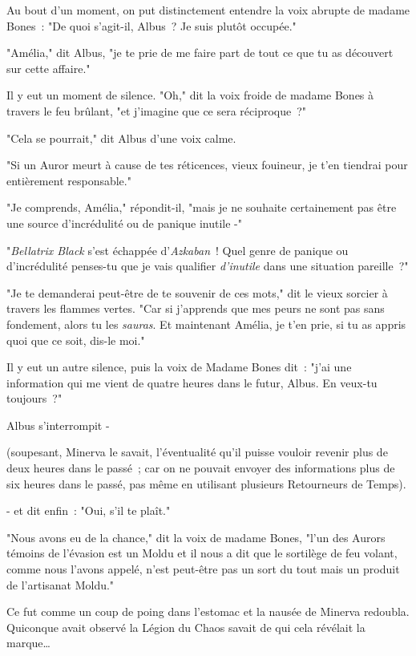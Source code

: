 Au bout d'un moment, on put distinctement entendre la voix abrupte de madame Bones~: "De quoi s'agit-il, Albus~? Je suis plutôt occupée."

"Amélia," dit Albus, "je te prie de me faire part de tout ce que tu as découvert sur cette affaire."

Il y eut un moment de silence. "Oh," dit la voix froide de madame Bones à travers le feu brûlant, "et j'imagine que ce sera réciproque~?"

"Cela se pourrait," dit Albus d'une voix calme.

"Si un Auror meurt à cause de tes réticences, vieux fouineur, je t'en tiendrai pour entièrement responsable."

"Je comprends, Amélia," répondit-il, "mais je ne souhaite certainement pas être une source d'incrédulité ou de panique inutile -"

"\emph{Bellatrix Black} s'est échappée d'\emph{Azkaban}~! Quel genre de panique ou d'incrédulité penses-tu que je vais qualifier \emph{d'inutile} dans une situation pareille~?"

"Je te demanderai peut-être de te souvenir de ces mots," dit le vieux sorcier à travers les flammes vertes. "Car si j'apprends que mes peurs ne sont pas sans fondement, alors tu les \emph{sauras}. Et maintenant Amélia, je t'en prie, si tu as appris quoi que ce soit, dis-le moi."

Il y eut un autre silence, puis la voix de Madame Bones dit~: "j'ai une information qui me vient de quatre heures dans le futur, Albus. En veux-tu toujours~?"

Albus s'interrompit -

(soupesant, Minerva le savait, l'éventualité qu'il puisse vouloir revenir plus de deux heures dans le passé~; car on ne pouvait envoyer des informations plus de six heures dans le passé, pas même en utilisant plusieurs Retourneurs de Temps).

- et dit enfin~: "Oui, s'il te plaît."

"Nous avons eu de la chance," dit la voix de madame Bones, "l'un des Aurors témoins de l'évasion est un Moldu et il nous a dit que le sortilège de feu volant, comme nous l'avons appelé, n'est peut-être pas un sort du tout mais un produit de l'artisanat Moldu."

Ce fut comme un coup de poing dans l'estomac et la nausée de Minerva redoubla. Quiconque avait observé la Légion du Chaos savait de qui cela révélait la marque…

